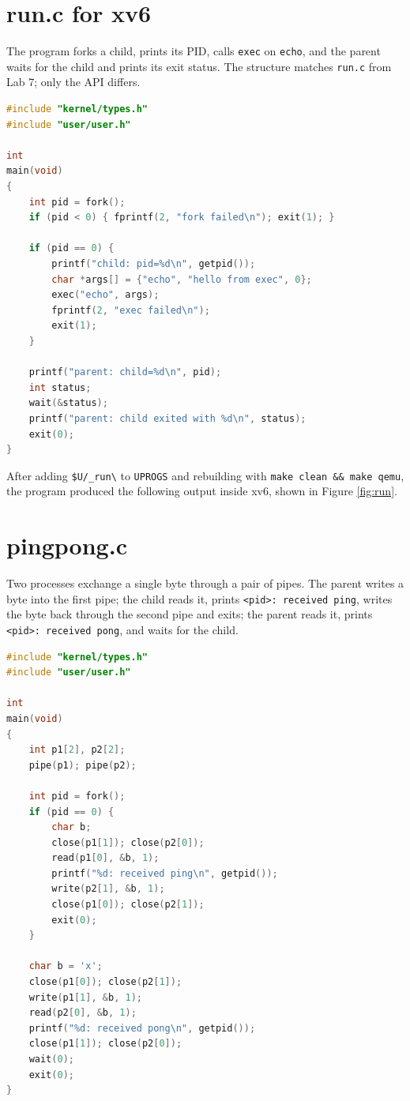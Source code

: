\documentclass[12pt,a4paper]{article}
\begin{document}
\section{run.c for xv6}

The program forks a child, prints its PID, calls \texttt{exec} on \texttt{echo}, and the parent waits for the child and prints its exit status. The structure matches \texttt{run.c} from Lab 7; only the API differs.

\begin{lstlisting}[language=C]
#include "kernel/types.h"
#include "user/user.h"

int
main(void)
{
    int pid = fork();
    if (pid < 0) { fprintf(2, "fork failed\n"); exit(1); }

    if (pid == 0) {
        printf("child: pid=%d\n", getpid());
        char *args[] = {"echo", "hello from exec", 0};
        exec("echo", args);
        fprintf(2, "exec failed\n");
        exit(1);
    }

    printf("parent: child=%d\n", pid);
    int status;
    wait(&status);
    printf("parent: child exited with %d\n", status);
    exit(0);
}
\end{lstlisting}

After adding \texttt{\$U/\_run\textbackslash} to \texttt{UPROGS} and rebuilding with \texttt{make clean \&\& make qemu}, the program produced the following output inside xv6, shown in Figure \ref{fig:run}.

\section{pingpong.c}

Two processes exchange a single byte through a pair of pipes. The parent writes a byte into the first pipe; the child reads it, prints \texttt{<pid>: received ping}, writes the byte back through the second pipe and exits; the parent reads it, prints \texttt{<pid>: received pong}, and waits for the child.

\begin{lstlisting}[language=C]
#include "kernel/types.h"
#include "user/user.h"

int
main(void)
{
    int p1[2], p2[2];
    pipe(p1); pipe(p2);

    int pid = fork();
    if (pid == 0) {
        char b;
        close(p1[1]); close(p2[0]);
        read(p1[0], &b, 1);
        printf("%d: received ping\n", getpid());
        write(p2[1], &b, 1);
        close(p1[0]); close(p2[1]);
        exit(0);
    }

    char b = 'x';
    close(p1[0]); close(p2[1]);
    write(p1[1], &b, 1);
    read(p2[0], &b, 1);
    printf("%d: received pong\n", getpid());
    close(p1[1]); close(p2[0]);
    wait(0);
    exit(0);
}
\end{lstlisting}
\end{document}

